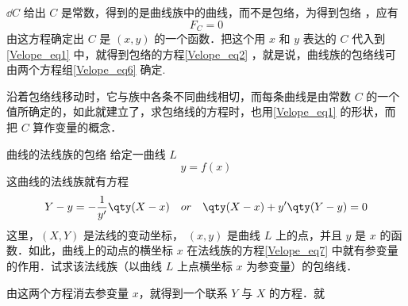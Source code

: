 $\dd C$ 给出 $C$ 是常数，得到的是曲线族中的曲线，而不是包络，为得到包络
，应有
\begin{equation}
F_C=0
\end{equation}
由这方程确定出 $C$ 是 $(x,y)$ 的一个函数．把这个用 $x$ 和 $y$ 表达的 $C$ 代入到\autoref{Velope_eq1} 中，就得到包络的方程\autoref{Velope_eq2} ，就是说，曲线族的包络线可由两个方程组\autoref{Velope_eq6} 确定.

沿着包络线移动时，它与族中各条不同曲线相切，而每条曲线是由常数 $C$ 的一个值所确定的，如此就建立了，求包络线的方程时，也用\autoref{Velope_eq1} 的形状，而把 $C$ 算作变量的概念．
\begin{example}{曲线的法线族的包络}
给定一曲线 $L$
\begin{equation}
y=f(x)
\end{equation}
这曲线的法线族就有方程
\begin{equation}\label{Velope_eq7}
Y-y=-\frac{1}{y'}\qty(X-x)\quad or\quad\qty(X-x)+y'\qty(Y-y)=0
\end{equation}
这里，$(X,Y)$ 是法线的变动坐标， $(x,y)$ 是曲线 $L$ 上的点，并且 $y$ 是 $x$ 的函数．如此，曲线上的动点的横坐标 $x$ 在法线族的方程\autoref{Velope_eq7} 中就有参变量的作用．试求该法线族（以曲线 $L$ 上点横坐标 $x$ 为参变量）的包络线．

由这两个方程消去参变量 $x$，就得到一个联系 $Y$ 与 $X$ 的方程．就
\end{example}
